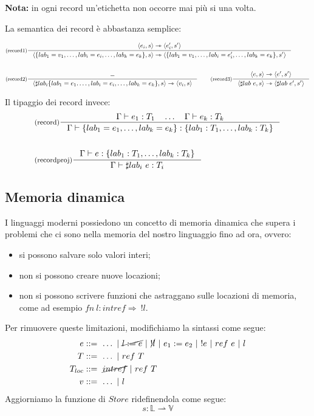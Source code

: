 \documentclass[a4paper, 11pt]{article}
\newcommand{\type}{\Gamma \vdash}
\newcommand{\goesto}{\rightarrowtriangle}
\begin{document}
\textbf{Nota:} in ogni record un'etichetta non occorre mai più si una volta.

La semantica dei record è abbastanza semplice:
\begin{adjustwidth}{-1.3cm}{}
	\begin{align*}
	&\inference[(record1)]{\langle e_i, s \rangle \goesto \langle e_i',s' \rangle}{\langle \lbrace lab_1=v_1, \dots, lab_i = e_i, \dots, lab_k = e_k \rbrace, s \rangle \goesto \langle \lbrace lab_1=v_1, \dots, lab_i = e_i', \dots, lab_k = e_k \rbrace, s' \rangle} \\ \\
	&\inference[(record2)]{-}{\langle \sharp lab_i \lbrace lab_1=e_1. \dots, lab_i=e_i, \dots, lab_k=e_k \rbrace, s \rangle \goesto \langle v_i, s \rangle} \qquad \inference[(record3)]{\langle e,s \rangle \goesto \langle e',s' \rangle}{\langle \sharp lab\ e,s \rangle \goesto \langle \sharp lab\ e',s' \rangle}
	\end{align*}
\end{adjustwidth}

Il tipaggio dei record invece: \begin{align*}
	&\inference[(record)]{\type e_1:T_1 \quad \dots \quad \type e_k:T_k}{\type \lbrace lab_1=e_1, \dots, lab_k=e_k \rbrace : \lbrace lab_1:T_1, \dots, lab_k:T_k \rbrace} \\ \\
	&\inference[(recordproj)]{\type e: \lbrace lab_1:T_1, \dots, lab_k:T_k \rbrace}{\type \sharp lab_i\ e:T_i}
\end{align*}

\subsection{Memoria dinamica}
I linguaggi moderni possiedono un concetto di memoria dinamica che supera i problemi che ci sono nella memoria del nostro linguaggio fino ad ora, ovvero: \begin{itemize}
	\item si possono salvare solo valori interi;
	\item non si possono creare nuove locazioni;
	\item non si possono scrivere funzioni che astraggano sulle locazioni di memoria, come ad esempio $fn\ l:intref \Rightarrow\ !l$.
\end{itemize}

Per rimuovere queste limitazioni, modifichiamo la sintassi come segue\footnotemark: \begin{align*}
	e &::=\ \dots\ |\ \cancel{l:=e}\ |\ \cancel{!l}\ |\ e_1:=e_2\ |\ !e\ |\ ref\ e\ |\ l \\
	T &::=\ \dots\ |\ ref\ T \\
	T_{loc} &::=\ \cancel{intref}\ |\ ref\ T \\
	v &::=\ \dots\ |\ l
\end{align*}
Aggiorniamo la funzione di $Store$ ridefinendola come segue: \[ s: \mathbb{L} \rightharpoonup \mathbb{V} \]
\end{document}
